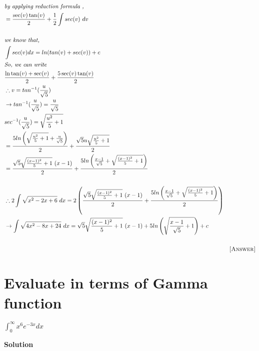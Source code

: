 \documentclass[12pt]{article}
\begin{document}
\begin{align*}
    &\textit{by applying reduction formula ,}\\
    &=\frac{\sec(v)\tan(v)}{2}+\frac{1}{2} \int sec(v) \ dv\\\\
    &\textit{we know that,}\\
    & \int sec(v) dx = ln(tan(v)+sec(v))+c\\
    &\textit{So, we can write}\\
    &\frac{\ln{\tan(v)+\sec(v)}}{2}+ \frac{5\sec(v)\tan(v)}{2}\\
    & \therefore v=tan^{-1}(\frac{u}{\sqrt{5}})\\
    & \rightarrow tan^{-1}(\frac{u}{\sqrt{5}})=\frac{u}{\sqrt{5}}\\
    &sec^{-1}(\frac{u}{\sqrt{5}})=\sqrt{\frac{u^2}{5}+1}\\
    &= \frac{5ln\left(\sqrt{\frac{u^2}{5}+1}+\frac{u}{\sqrt{5}} \right)}{2} + \frac{\sqrt{5} u \sqrt{\frac{u^2}{5}+1}}{2}\\
    &=\frac{\sqrt{5}\sqrt{\frac{(x-1)^2}{5}+1} \ (x-1)}{2} + \frac{5ln\left( \frac{x-1}{\sqrt{5}} + \sqrt{\frac{(x-1)^2}{5}+1}\right)}{2}\\\\
    &\therefore 2\int \sqrt{x^2-2x+6} \ dx = 2 \left( \frac{\sqrt{5}\sqrt{\frac{(x-1)^2}{5}+1} \ (x-1)}{2} + \frac{5ln\left( \frac{x-1}{\sqrt{5}} + \sqrt{\frac{(x-1)^2}{5}+1}\right)}{2}\right)\\
    &\rightarrow \int \sqrt{4x^2-8x+24} \ dx = \sqrt{5}\sqrt{\frac{(x-1)^2}{5}+1} \ (x-1) + 5ln\left(\sqrt{\frac{x-1}{\sqrt{5}} + 1 }\right) + c\\\\
    & &\textsc{[Answer]}
\end{align*}

\pagebreak



\section{Evaluate in terms of Gamma function}

\begin{center}
    $\int_{0}^{\infty}x^6 e^{-3x}dx$
\end{center}

\textbf{Solution}
\end{document}

